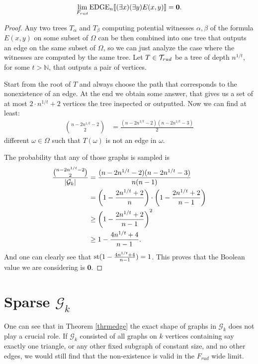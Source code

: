 \begin{thrm}\label{thrmedge}
\[\lim_{F_{rud}}\text{EDGE}_n[\![(\exists x)(\exists y)E(x,y)]\!]=\textbf{0}.\]
\end{thrm}
\begin{proof}
Any two trees $T_\alpha$ and $T_\beta$ computing potential witnesses $\alpha,\beta$ of the formula $E(x,y)$ on some subset of $\Omega$ can be then combined into one tree that outputs an edge on the same subset of $\Omega$, so we can just analyze the case where the witnesses are computed by the same tree.
Let $T\in \mathcal{T}_{rud}$ be a tree of depth $n^{1/t}$, for some $t>\mathbb{N}$, that outputs a pair of vertices.

Start from the root of $T$ and always choose the path that corresponds to the nonexistence of an edge. At the end we obtain some answer, that gives us a set of at most $2 \cdot n^{1/t}+2$ vertices the tree inspected or outputted. Now we can find at least: 
\begin{align}
\binom{n-2n^{1/t}-2}{2}&=\frac{(n-2n^{1/t}-2)(n-2n^{1/t}-3)}{2}
\end{align}
different $\omega\in\Omega$ such that $T(\omega)$ is not an edge in $\omega$. 

The probability that any of those graphs is sampled is
\begin{align}
\frac{\binom{n-2n^{1/t}-2}{2}}{\left|{\mathcal{G}_k}\right|}&=\frac{(n-2n^{1/t}-2)(n-2n^{1/t}-3)}{n(n-1)}\\
&=\left(1-\frac{2n^{1/t}+2}{n}\right)\cdot\left(1-\frac{2n^{1/t}+2}{n-1}\right)\\
&\geq \left(1-\frac{2n^{1/t}+2}{n-1}\right)^2\\
&\geq 1-\frac{4n^{1/t}+4}{n-1}.
\end{align}
And one can clearly see that $\text{st}(1-\frac{4n^{1/t}+4}{n-1})=1$. This proves that the Boolean value we are considering is $\textbf{0}$.
\end{proof}

\section{Sparse \texorpdfstring{$\mathcal{G}_k$}{Gk}}

One can see that in Theorem \ref{thrmedge} the exact shape of graphs in $\mathcal{G}_k$ does not play a crucial role. If $\mathcal{G}_k$ consisted of all graphs on $k$ vertices containing say exactly one triangle, or any other fixed subgraph of constant size, and no other edges, we would still find that the non-existence is valid in the $F_{rud}$ wide limit.

